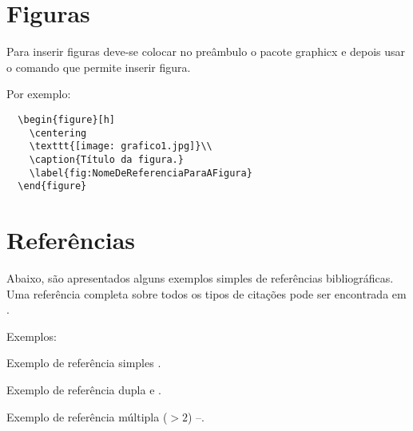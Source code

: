 \section{Figuras}

Para inserir figuras deve-se colocar no preâmbulo o pacote graphicx e depois usar o comando
que permite inserir figura.

Por exemplo:

\begin{verbatim}
  \begin{figure}[h]
    \centering
    \texttt{[image: grafico1.jpg]}\\
    \caption{Título da figura.}
    \label{fig:NomeDeReferenciaParaAFigura}
  \end{figure}
\end{verbatim}

\section{Referências}

Abaixo, 
são apresentados alguns exemplos simples de referências bibliográficas.
Uma referência completa sobre todos os tipos de citações pode ser encontrada
em \cite{norma:esjo2005}.

Exemplos:

Exemplo de referência simples \cite{livro:circuit}.

Exemplo de referência dupla \cite{livro:circuit} e \cite{book:signal}.

Exemplo de referência múltipla ($> 2$) \cite{livro:circuit}--\cite{book:signal}.